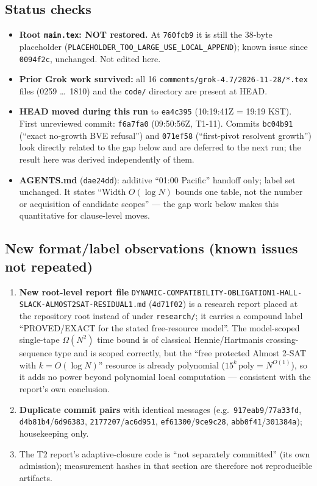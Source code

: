 \documentclass[11pt]{article}
\theoremstyle{definition}
\begin{document}
\subsection{Status checks}
\begin{itemize}
\item \textbf{Root \texttt{main.tex}: NOT restored.} At \texttt{760fcb9} it is still the 38-byte placeholder
(\texttt{PLACEHOLDER\_TOO\_LARGE\_USE\_LOCAL\_APPEND}); known issue since \texttt{0094f2c}, unchanged. Not edited here.
\item \textbf{Prior Grok work survived:} all 16 \texttt{comments/grok-4.7/2026-11-28/*.tex} files
(0259 \dots\ 1810) and the \texttt{code/} directory are present at HEAD.
\item \textbf{HEAD moved during this run} to \texttt{ea4c395} (10:19:41Z = 19:19 KST). First unreviewed commit:
\texttt{f6a7fa0} (09:50:56Z, T1-11). Commits \texttt{bc04b91} (``exact no-growth BVE refusal'') and \texttt{071ef58}
(``first-pivot resolvent growth'') look directly related to the gap below and are deferred to the next run; the
result here was derived independently of them.
\item \textbf{AGENTS.md} (\texttt{dae24dd}): additive ``01:00 Pacific'' handoff only; label set unchanged.
It states ``Width $O(\log N)$ bounds one table, not the number or acquisition of candidate scopes'' --- the
gap work below makes this quantitative for clause-level moves.
\end{itemize}

\subsection{New format/label observations (known issues not repeated)}
\begin{enumerate}
\item \textbf{New root-level report file} \texttt{DYNAMIC-COMPATIBILITY-OBLIGATION1-HALL-SLACK-ALMOST2SAT-RESIDUAL1.md}
(\texttt{4d71f02}) is a research report placed at the repository root instead of under \texttt{research/}; it
carries a compound label ``PROVED/EXACT for the stated free-resource model''. The model-scoped single-tape
$\Omega(N^2)$ time bound is of classical Hennie/Hartmanis crossing-sequence type and is scoped correctly, but the
``free protected Almost 2-SAT with $k=O(\log N)$'' resource is already polynomial ($15^k\,\mathrm{poly}=N^{O(1)}$),
so it adds no power beyond polynomial local computation --- consistent with the report's own conclusion.
\item \textbf{Duplicate commit pairs} with identical messages (e.g.\ \texttt{917eab9}/\texttt{77a33fd},
\texttt{d4b81b4}/\texttt{6d96383}, \texttt{2177207}/\texttt{ac6d951}, \texttt{ef61300}/\texttt{9ce9c28},
\texttt{abb0f41}/\texttt{301384a}); housekeeping only.
\item The T2 report's adaptive-closure code is ``not separately committed'' (its own admission); measurement
hashes in that section are therefore not reproducible artifacts.
\end{enumerate}
\end{document}
